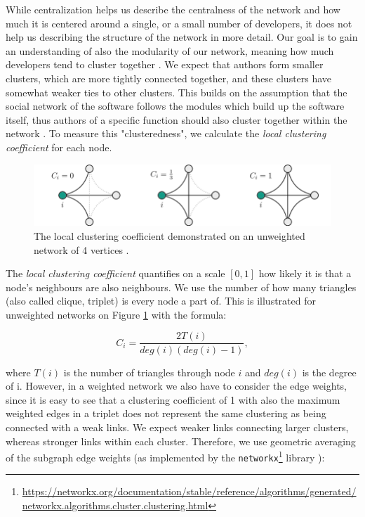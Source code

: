 While centralization helps us describe the centralness of the network and how much it is centered around a single, or a small number of developers, it does not help us describing the structure of the network in more detail. Our goal is to gain an understanding of also the modularity of our network, meaning how much developers tend to cluster together \cite{joblinEvolutionaryTrendsDeveloper2017}. We expect that authors form smaller clusters, which are more tightly connected together, and these clusters have somewhat weaker ties to other clusters. This builds on the assumption that the social network of the software follows the modules which build up the software itself, thus authors of a specific function should also cluster together within the network \cite{conwayHowCommitteesInvent1968, joblinEvolutionaryTrendsDeveloper2017}. To measure this "clusteredness", we calculate the \textit{local clustering coefficient} for each node. \\

\begin{figure}
    \centering
    \includegraphics[width=1\textwidth]{figures/loc_clust_coeff.png}
    \caption{The local clustering coefficient demonstrated on an unweighted network of 4 vertices \cite{jedrzejewskiRoleComplexNetworks2016}.}
    \label{fig:loc clust coeff}
\end{figure}

The \textit{local clustering coefficient} quantifies on a scale $[0, 1]$ how likely it is that a node's neighbours are also neighbours. We use the number of how many triangles (also called clique, triplet) is every node a part of. This is illustrated for unweighted networks on Figure \ref{fig:loc clust coeff} with the formula:

\[ C_i = \frac{2T(i)}{deg(i)(deg(i)-1)}, \]

where $T(i)$ is the number of triangles through node $i$ and $deg(i)$ is the degree of i. However, in a weighted network we also have to consider the edge weights, since it is easy to see that a clustering coefficient of 1 with also the maximum weighted edges in a triplet does not represent the same clustering as being connected with a weak links. We expect weaker links connecting larger clusters, whereas stronger links within each cluster. Therefore, we use geometric averaging of the subgraph edge weights (as implemented by the \texttt{networkx}\footnote{\url{https://networkx.org/documentation/stable/reference/algorithms/generated/networkx.algorithms.cluster.clustering.html}} library \cite{onnelaIntensityCoherenceMotifs2005}):


